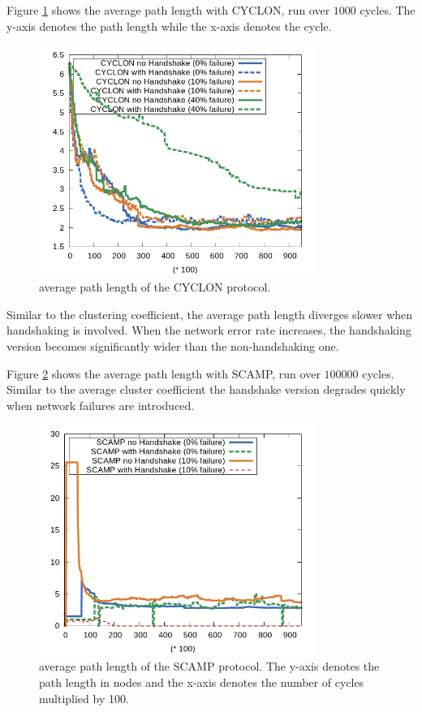 \documentclass[11pt, english, screen]{report-rd-info}
\begin{document}
Figure \ref{fig:path_cyclon} shows the average path length with CYCLON, run over $1000$ cycles.
The y-axis denotes the path length while the x-axis denotes the cycle.

\begin{figure}[H]
    \centering
    \includegraphics[width=9cm]{Images/statistics/cyclon_1000_c20/avgpath/all}
    \caption{average path length of the CYCLON protocol. }
    \label{fig:path_cyclon}
\end{figure}

Similar to the clustering coefficient, the average path length diverges slower when handshaking is involved.
When the network error rate increases, the handshaking version becomes significantly wider than the non-handshaking one.

Figure \ref{fig:f_scamp1} shows the average path length with SCAMP, run over $100000$ cycles.
Similar to the average cluster coefficient the handshake version degrades quickly when network failures are introduced.

\begin{figure}[H]
    \centering
    \includegraphics[width=9cm]{Images/statistics/scamp_1000_c2/avgpath/all}
    \caption{average path length of the SCAMP protocol. The y-axis denotes the path length in nodes and the x-axis denotes the number of cycles multiplied by 100.}
    \label{fig:f_scamp1}
\end{figure}
\end{document}
